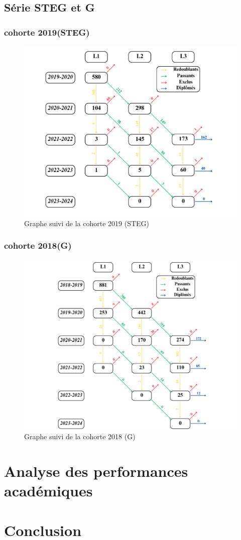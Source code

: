 \newpage
\subsection{Série STEG et G}

\subsubsection{cohorte 2019(STEG)}

\begin{figure}[ht]
    \centering
    \caption{Graphe suivi de la cohorte 2019 (STEG)}
    \includegraphics[width=1\textwidth]{figure/STEG_2019.png}
\end{figure}

\newpage
\subsubsection{cohorte 2018(G)}

\begin{figure}[ht]
    \centering
    \caption{Graphe suivi de la cohorte 2018 (G)}
    \includegraphics[width=1\textwidth]{figure/G_2018.png}
\end{figure}

\newpage

\section{Analyse des performances académiques}
\section{Conclusion}